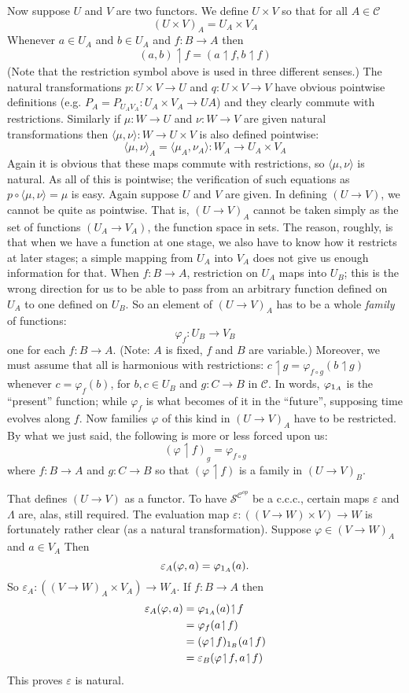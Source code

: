 \documentclass[12pt]{article}
\def\to{\rightarrow}
\def\id{{\textrm 1}}
\def\res{\!\upharpoonleft\!}
\def\ffam{\varphi}
\def\comp{\circ}
\def\ccc{{c.c.c.}}
\def\ev{\varepsilon}
\def\L{\Lambda}
\def\C{\mathcal C}
\def\S{\mathcal S}
\def\scop{\S^{\C^{op}}}
\begin{document}
Now suppose $U$ and $V$ are two functors. We define $U \times V$ so that for all $A \in \C$
$$
(U \times V)_A = U_A \times V_A
$$
%
Whenever $a \in U_A$ and $b \in U_A$ and $f: B \to A$ then
$$
(a,b) \res f = (a \res f, b \res f)
$$
(Note that the restriction symbol above is used in three different senses.) The natural transformations $p : U \times V \to U$ and $q: U\times V \to V$ have obvious pointwise definitions  (e.g. $P_A= P_{{U_A}{V_A}} : U_A \times V_A \to UA$) and they clearly commute with restrictions. Similarly if $\mu: W \to U$ and $\nu: W\to V$ are given natural transformations then $\langle \mu, \nu \rangle: W \to U \times V$ is also defined pointwise:
$$
{\langle \mu, \nu \rangle}_A = \langle \mu_A, \nu_A \rangle : W_A \to U_A \times V_A
$$
%
Again it is obvious that these maps commute with restrictions, so ${\langle \mu, \nu \rangle}$ is natural. As all of this is pointwise; the verifi­cation of such equations as $p \comp \langle \mu, \nu \rangle = \mu$ is easy. Again suppose $U$ and $V$ are given. In defining $(U \to V)$, we cannot be quite as pointwise. That is, $(U \to V)_A$ cannot be taken simply as the set of functions $(U_A \to V_A)$, the function space in sets. The reason, roughly, is that when we have a function at one stage, we also have to know how it restricts at later stages; a simple mapping from $U_A$ into $V_A$ does not give us enough information for that. When $f : B\to A$, restriction on
$U_A$ maps into $U_B$; this is the wrong direction for us to be able to pass from an arbitrary function defined on $U_A$ to one defined on $U_B$. So an element of $(U \to V)_A$ has to be a whole {\it family} of functions:
$$
\ffam_f: U_B \to V_B
$$
%
one for each $f: B \to A$. (Note: $A$ is fixed, $f$ and $B$ are variable.) Moreover, we must assume that all is harmonious with
restrictions: $c \res g = \ffam_{f \comp g} (b \res g)$ whenever $c = \ffam_f(b)$, for $b,c \in U_B$ and $g : C\to B$ in $\C$. In words, $\ffam_{\id_A}$ is the ``present'' function; while $\ffam_f$ is what becomes of it in the ``future'', sup­posing time evolves along $f$. Now families $\ffam$ of this kind in
$(U\to V)_A$ have to be restricted. By what we just said, the fol­lowing is more or less forced upon us:
$$
(\ffam \res f)_g = \ffam_{f\comp g}
$$
%
where $f : B \to A$ and $g: C\to B$ so that $(\ffam \res f)$ is a family in $(U\to V)_B$. 

That defines $(U\to V)$ as a functor. To have $\scop$ be a \ccc, certain maps $\ev$ and $\L$ are, alas, still required. The evaluation map $\ev : ((V\to W) \times V) \to W$ is fortunately rather clear (as a natural transformation). Suppose $\ffam \in (V \to W)_A$ and $a \in V_A$ Then
$$
\ev_A(\ffam, a) = \ffam_{\id_A} (a).
$$
%
So $\ev_A : ((V \to W)_A \times V_A) \to W_A$. If $f: B \to A$ then 
\begin{align*}
\ev_A(\ffam, a) &= \ffam_{\id_A}(a) \res f\\
&= \ffam_f(a \res f)\\
&= (\ffam \res f)_{\id_B} (a \res f)\\
&= \ev_B(\ffam \res f, a \res f)
\end{align*}
%
This proves $\ev$ is natural.
\end{document}
